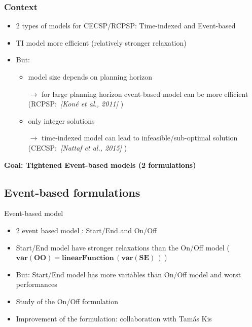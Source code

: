 
\begin{frame}
  \frametitle{Context}
  \begin{itemize}
  \item 2 types of models for CECSP/RCPSP: Time-indexed and Event-based
    \vfill
    \pause
  \item TI model more efficient {\small (relatively stronger relaxation)}
    \pause
    \vfill
  \item But:
    \begin{itemize}
    \item  model size depends on planning horizon 
      
      {\footnotesize  $\longrightarrow $ for large planning horizon event-based model can be more
        efficient (RCPSP:~{\color{gray!50!black!70}\it [Koné et al.,
          2011]} )}
      \vfill
      \pause
    \item only integer solutions
      
      {\footnotesize $\longrightarrow$ time-indexed model can lead to
        infeasible/sub-optimal solution
        (CECSP:~{\color{gray!50!black!70}\it [Nattaf et al., 2015]} )}
    \end{itemize}
  \end{itemize}
  \vfill
  \pause
  {\bf Goal: Tightened Event-based models (2 formulations)} 
\end{frame}

\subsection{Event-based formulations}
\begin{frame}{Event-based model}
  \vfill
  \begin{itemize}
  \item 2 event based model : Start/End and On/Off
    \vfill
    \pause
  \item Start/End model have stronger relaxations than the On/Off
    model ( $\mathbf{var(OO) = linearFunction\, (var (SE)\, )\  }$)
    \pause
    \vfill
  \item But: Start/End model has more variables than On/Off model
    \pause
    and worst performances  
    \vfill
    \pause
  \item Study of the On/Off formulation
    \vfill
    \pause
  \item Improvement of the formulation: collaboration with Tam{\'a}s Kis 
  \end{itemize} 
  \vfill
\end{frame}


